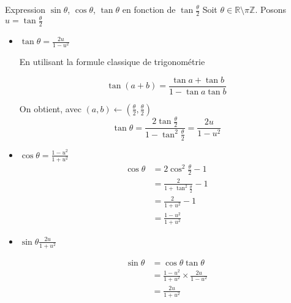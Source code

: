 \documentclass{article}
\begin{document}
\begin{question_kholle}{Expression $\sin \theta$, $\cos \theta$, $\tan \theta$ en fonction de $\tan \frac \theta 2$}
    Soit $\theta \in \mathbb{R} \setminus \pi \mathbb{Z}$.
    Posons $u = \tan \frac{\theta}{2}$
    \begin{itemize}[label=$\lozenge$]
        \item $\tan \theta = \frac{2u}{1-u^{2}}$
        
        En utilisant la formule classique de trigonométrie
        
        $$\tan (a+b) = \frac{\tan a+\tan b}{1-\tan a\tan b}$$
        
        On obtient, avec $(a,b) \leftarrow (\frac{\theta}{2}, \frac{\theta}{2})$
        $$
        \tan \theta = \frac{2 \tan \frac{\theta}{2}}{1-\tan ^{2} \frac{\theta}{2}}=\frac{2u}{1-u^{2}}
        $$
        
        
        \item $\cos \theta = \frac{1-u^{2}}{1+u^{2}}$
        \begin{align*}
            \cos \theta  & = 2\cos ^{2} \frac{\theta}{2} -1 \\
            & = \frac{2}{1+\tan ^{2} \frac{\theta}{2}} - 1 \\
            &= \frac{2}{1+u^{2}}-1 \\
            &= \frac{1-u^{2}}{1+u^{2}}
        \end{align*}
        
        \item $\sin \theta \frac{2u}{1+u^{2}}$
        
        \begin{align*}
            \sin \theta  & = \cos \theta \tan \theta \\
            & = \frac{1-u^{2}}{1+u^{2}} \times \frac{2u}{1-u^{2}} \\
            &= \frac{2u}{1+u^{2}}
        \end{align*}
    \end{itemize}
\end{question_kholle}
\end{document}
